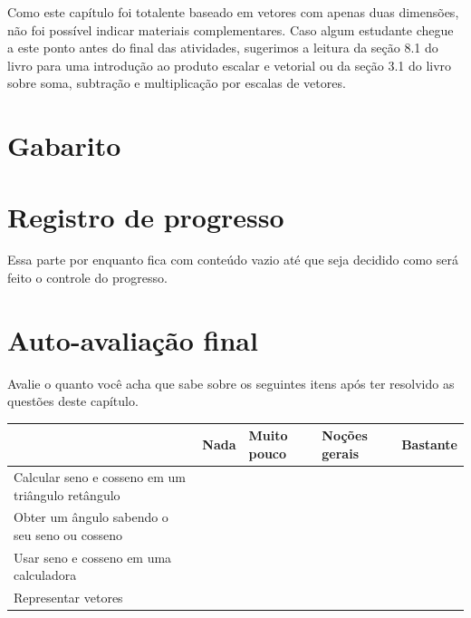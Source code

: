 \documentclass[main.tex]{subfiles}
\begin{document}
Como este capítulo foi totalente baseado em vetores com apenas duas dimensões, não foi possível indicar materiais complementares. Caso algum estudante chegue a este ponto antes do final das atividades, sugerimos a leitura da seção 8.1 do livro  para uma introdução ao produto escalar e vetorial ou da seção 3.1 do livro  sobre soma, subtração e multiplicação por escalas de vetores.

\newpage

\section{Gabarito}

\imprimeGabarito

\paraFolhaAvaliacoes

\section{Registro de progresso}

Essa parte por enquanto fica com conteúdo vazio até que seja decidido como será feito o controle do progresso.
\vspace{5cm}

\paraAlunos

\section{Auto-avaliação final}
Avalie o quanto você acha que sabe sobre os seguintes itens após ter resolvido as questões deste capítulo.

\paraFolhaAvaliacoes

\begin{center}
 \begin{tabular}{|p{35mm}||p{15mm}|p{15mm}|p{15mm}|p{15mm}|} 
 \hline
   & Nada & Muito pouco & Noções gerais & Bastante\\
 \hline
 Calcular seno e cosseno em um triângulo retângulo &  &  &  &  \\ 
 \hline
 Obter um ângulo sabendo o seu seno ou cosseno &  &  &  &  \\
 \hline
 Usar seno e cosseno em uma calculadora &  &  &  &  \\
 \hline
 Representar vetores &  &  &  &  \\
 \hline
\end{tabular}
\end{center}
\end{document}
